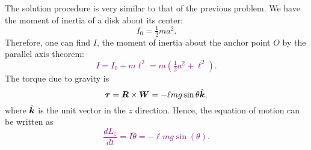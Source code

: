 \documentclass[12pt]{article}
\begin{document}
\begin{ex}
\begin{figure}[!h]
\begin{center}
\begin{tikzpicture}
\end{tikzpicture}
\end{center}
\end{figure}

\begin{solution}
  The solution procedure is very similar to that of the previous problem. We have the moment of inertia of a disk about its center:
  $$I_0=\tfrac{1}{2}ma^2.$$
  Therefore, one can find $I$, the moment of inertia about the anchor point $O$ by the parallel axis theorem:\textcolor{purple}{
    $$I=I_0+m\ell^2=m\left(\tfrac{1}{2}a^2+\ell^2\right).$$}%
  The torque due to gravity is
  $$\V{\tau}=\V{R}\times\V{W}=-\ell mg\sin{\theta}\hat{\V{k}},$$
  where $\hat{\V{k}}$ is the unit vector in the $z$ direction. Hence, the equation of motion can be written as\textcolor{purple}{
  $$\frac{dL_z}{dt}=I\ddot{\theta}=-\ell mg\sin(\theta).$$}%
\end{solution}
\end{ex}
\end{document}
